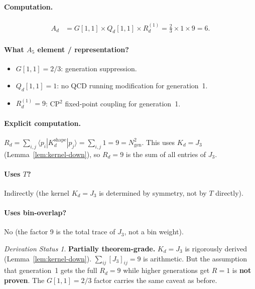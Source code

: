 \documentclass[11pt]{article}
\theoremstyle{remark}
\newtheorem*{status}{Derivation Status}
\begin{document}
\paragraph{Computation.}
\begin{align}
A_d &= G[1,1] \times Q_d[1,1] \times R_d^{(1)} = \frac{2}{3} \times 1 \times 9 = 6.
\end{align}

\paragraph{What $A_5$ element / representation?}
\begin{itemize}[nosep]
  \item $G[1,1] = 2/3$: generation suppression.
  \item $Q_d[1,1] = 1$: no QCD running modification for generation~1.
  \item $R_d^{(1)} = 9$: CP$^2$ fixed-point coupling for generation~1.
\end{itemize}

\paragraph{Explicit computation.}
$R_d = \sum_{i,j} \langle p_i | K_d^{\mathrm{shape}} | p_j \rangle = \sum_{i,j} 1 = 9 = N_{\mathrm{gen}}^2$.
This uses $K_d = J_3$ (Lemma~\ref{lem:kernel-down}), so $R_d = 9$ is the sum of all entries of $J_3$.

\paragraph{Uses $T$?} Indirectly (the kernel $K_d = J_3$ is determined by symmetry, not by $T$ directly).
\paragraph{Uses bin-overlap?} No (the factor 9 is the total trace of $J_3$, not a bin weight).

\begin{status}
\textbf{Partially theorem-grade.}
$K_d = J_3$ is rigorously derived (Lemma~\ref{lem:kernel-down}).
$\sum_{ij} [J_3]_{ij} = 9$ is arithmetic.
But the assumption that generation~1 gets the full $R_d = 9$ while higher generations get $R = 1$ is \textbf{not proven}.
The $G[1,1] = 2/3$ factor carries the same caveat as before.
\end{status}

\end{document}
